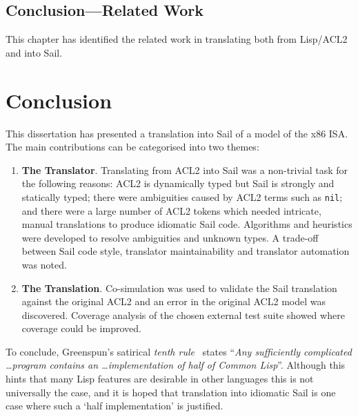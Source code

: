 \documentclass[a4paper,12pt,twoside,openright]{report}
\begin{document}
\section{Conclusion---Related Work}

This chapter has identified the related work in translating both from Lisp/ACL2 and into Sail.

\hypertarget{chapter-conclusion}{
\chapter{Conclusion}\label{chapter-conclusion}}

This dissertation has presented a translation into Sail of a model of the x86 ISA.  The main contributions can be categorised into two themes:

\begin{enumerate}
  \item \textbf{The Translator}.  Translating from ACL2 into Sail was a non-trivial task for the following reasons: ACL2 is dynamically typed but Sail is strongly and statically typed; there were ambiguities caused by ACL2 terms such as \texttt{nil}; and there were a large number of ACL2 tokens which needed intricate, manual translations to produce idiomatic Sail code.  Algorithms and heuristics were developed to resolve ambiguities and unknown types.  A trade-off between Sail code style, translator maintainability and translator automation was noted.

  \item \textbf{The Translation}.  Co-simulation was used to validate the Sail translation against the original ACL2 and an error in the original ACL2 model was discovered.  Coverage analysis of the chosen external test suite showed where coverage could be improved.
\end{enumerate}


To conclude, Greenspun's satirical \emph{tenth rule}~\cite{greenspun} states ``\emph{Any sufficiently complicated \ldots program contains an \ldots implementation of half of Common Lisp}''.  Although this hints that many Lisp features are desirable in other languages this is not universally the case, and it is hoped that translation into idiomatic Sail is one case where such a `half implementation' is justified.

\appendix
\singlespacing

%  
\clearpage
{}

\end{document}
